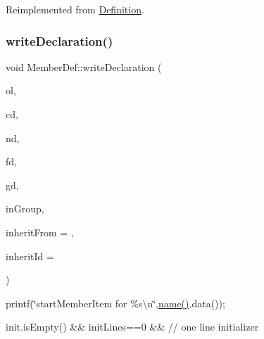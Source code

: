 Reimplemented from \mbox{\hyperlink{class_definition_a829959b92985d0264b9fc17277bf91b4}{Definition}}.

\mbox{\label{class_member_def_a73f56d5c2ca4ec4807a94c272d752e13}} 
\subsubsection{\texorpdfstring{writeDeclaration()}{writeDeclaration()}}
{\footnotesize\ttfamily void Member\+Def\+::write\+Declaration (\begin{DoxyParamCaption}\item[{\mbox{\hyperlink{class_output_list}{Output\+List}} \&}]{ol,  }\item[{\mbox{\hyperlink{class_class_def}{Class\+Def}} $\ast$}]{cd,  }\item[{\mbox{\hyperlink{class_namespace_def}{Namespace\+Def}} $\ast$}]{nd,  }\item[{\mbox{\hyperlink{class_file_def}{File\+Def}} $\ast$}]{fd,  }\item[{\mbox{\hyperlink{class_group_def}{Group\+Def}} $\ast$}]{gd,  }\item[{bool}]{in\+Group,  }\item[{\mbox{\hyperlink{class_class_def}{Class\+Def}} $\ast$}]{inherit\+From = {},  }\item[{const char $\ast$}]{inherit\+Id = {} }\end{DoxyParamCaption})}

printf(\char`\"{}start\+Member\+Item for \%s\textbackslash{}n\char`\"{},\mbox{\hyperlink{class_definition_a9324000f785d7b6b098878a3bca4df5b}{name()}}.data());

init.\+is\+Empty() \&\& init\+Lines==0 \&\& // one line initializer\mbox{\label{class_member_def_adec60dcd06f369aff38273e706a062d1}} 
